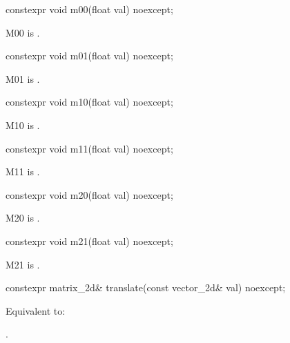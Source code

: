 %
\begin{itemdecl}
constexpr void m00(float val) noexcept;
\end{itemdecl}
\begin{itemdescr}
\pnum
\effects
M00 is .
\end{itemdescr}

%
\begin{itemdecl}
constexpr void m01(float val) noexcept;
\end{itemdecl}
\begin{itemdescr}
\pnum
\effects
M01 is .
\end{itemdescr}

%
\begin{itemdecl}
constexpr void m10(float val) noexcept;
\end{itemdecl}
\begin{itemdescr}
\pnum
\effects
M10 is .
\end{itemdescr}

%
\begin{itemdecl}
constexpr void m11(float val) noexcept;
\end{itemdecl}
\begin{itemdescr}
\pnum
\effects
M11 is .
\end{itemdescr}

%
\begin{itemdecl}
constexpr void m20(float val) noexcept;
\end{itemdecl}
\begin{itemdescr}
\pnum
\effects
M20 is .
\end{itemdescr}

%
\begin{itemdecl}
constexpr void m21(float val) noexcept;
\end{itemdecl}
\begin{itemdescr}
\pnum
\effects
M21 is .
\end{itemdescr}

%
\begin{itemdecl}
constexpr matrix_2d& translate(const vector_2d& val) noexcept;
\end{itemdecl}
\begin{itemdescr}
\pnum
\effects
Equivalent to: 

\pnum
\returns
{}.
\end{itemdescr}

